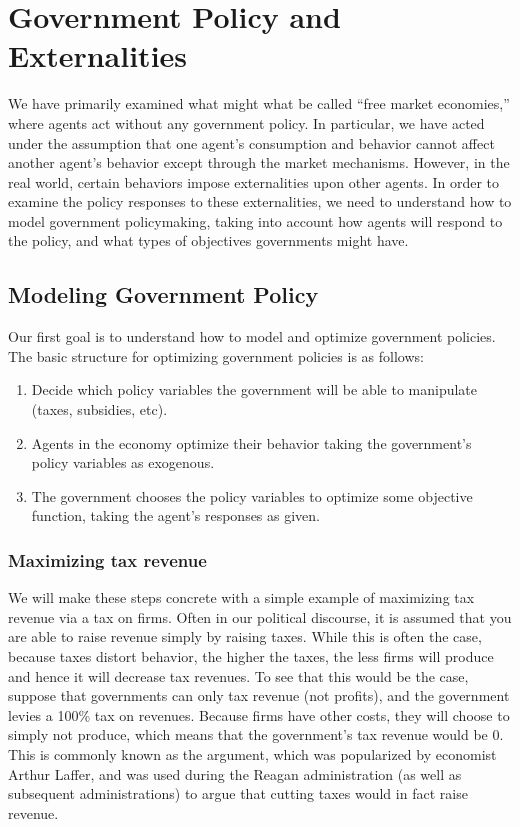 \chapter{Government Policy and Externalities}
We have primarily examined what might what be called ``free market economies,'' where agents act without any government policy. In particular, we have acted under the assumption that one agent's consumption and behavior cannot affect another agent's behavior except through the market mechanisms. However, in the real world, certain behaviors impose externalities upon other agents. In order to examine the policy responses to these externalities, we need to understand how to model government policymaking, taking into account how agents will respond to the policy, and what types of objectives governments might have. 


\section{Modeling Government Policy}
Our first goal is to understand how to model and optimize government policies. The basic structure for optimizing government policies is as follows:
\begin{enumerate}
    \item Decide which policy variables the government will be able to manipulate (taxes, subsidies, etc).
    \item Agents in the economy optimize their behavior taking the government's policy variables as exogenous. 
    \item The government chooses the policy variables to optimize some objective function, taking the agent's responses as given. 
\end{enumerate}

\subsection*{Maximizing tax revenue}
We will make these steps concrete with a simple example of maximizing tax revenue via a tax on firms. Often in our political discourse, it is assumed that you are able to raise revenue simply by raising taxes. While this is often the case, because taxes distort behavior, the higher the taxes, the less firms will produce and hence it will decrease tax revenues. To see that this would be the case, suppose that governments can only tax revenue (not profits), and the government levies a 100\% tax on revenues. Because firms have other costs, they will choose to simply not produce, which means that the government's tax revenue would be 0. This is commonly known as the  argument, which was popularized by economist Arthur Laffer, and was used during the Reagan administration (as well as subsequent administrations) to argue that cutting taxes would in fact raise revenue. 

